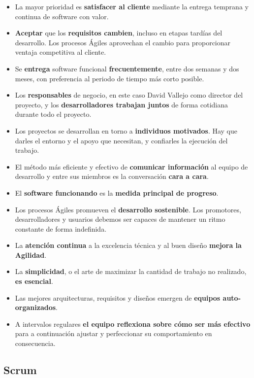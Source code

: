 \begin{itemize}
\item La mayor prioridad es \textbf{satisfacer al cliente} mediante la entrega temprana y continua de software con valor.
\item \textbf{Aceptar} que los \textbf{requisitos cambien}, incluso en etapas tardías del desarrollo. Los procesos Ágiles aprovechan el cambio para proporcionar ventaja competitiva al cliente.
\item Se \textbf{entrega} software funcional \textbf{frecuentemente}, entre dos semanas y dos meses, con preferencia al periodo de tiempo más corto posible.
\item Los \textbf{responsables} de negocio, en este caso David Vallejo como director del proyecto, y los \textbf{desarrolladores trabajan juntos} de forma cotidiana durante todo el proyecto.
\item Los proyectos se desarrollan en torno a \textbf{individuos motivados}. Hay que darles el entorno y el apoyo que necesitan, y confiarles la ejecución del trabajo.
\item El método más eficiente y efectivo de \textbf{comunicar información} al equipo de desarrollo y entre sus miembros es la conversación \textbf{cara a cara}. 
\item El \textbf{software funcionando} es la \textbf{medida principal de progreso}.
\item Los procesos Ágiles promueven el \textbf{desarrollo sostenible}. Los promotores, desarrolladores y usuarios debemos ser capaces de mantener un ritmo constante de forma indefinida.
\item La \textbf{atención continua} a la excelencia técnica y al buen diseño \textbf{mejora la Agilidad}.
\item La \textbf{simplicidad}, o el arte de maximizar la cantidad de trabajo no realizado, \textbf{es esencial}.
\item Las mejores arquitecturas, requisitos y diseños emergen de \textbf{equipos auto-organizados}.
\item A intervalos regulares \textbf{el equipo reflexiona sobre cómo ser más efectivo} para a continuación ajustar y perfeccionar su comportamiento en consecuencia. 
\end{itemize}

\subsection{Scrum}
\label{sec:scrum}


